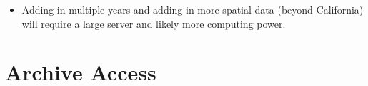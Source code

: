 \documentclass[
]{book}
\providecommand{\tightlist}{%
  \setlength{\itemsep}{0pt}\setlength{\parskip}{0pt}}
\begin{document}
\begin{itemize}
\tightlist
\item
  Adding in multiple years and adding in more spatial data (beyond California) will require a large server and likely more computing power.
\end{itemize}

\hypertarget{archive-access}{%
\chapter{Archive Access}\label{archive-access}}

  
\end{document}
